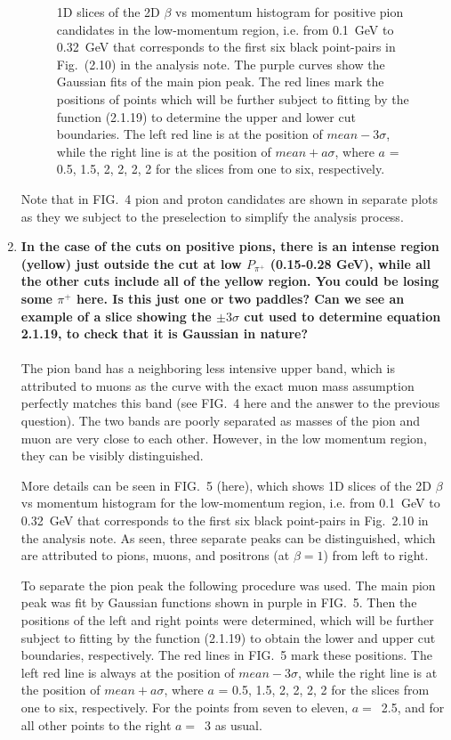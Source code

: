 \documentclass[,superscriptaddress,showpacs,amssymb,amsmath,amsfonts,linenumbers,article]{revtex4-1}
\begin{document}
\begin{enumerate}[label=\textbf{\arabic*}.]
\begin{figure}[!ht]
\caption{\small 1D slices of the 2D $\beta$ vs momentum histogram for positive pion candidates in the low-momentum region, i.e. from 0.1~GeV to 0.32~GeV that corresponds to the first six black point-pairs in Fig.~(2.10) in the analysis note. The purple curves show the Gaussian fits of the main pion peak. The red lines mark the positions of points which will be further subject to fitting by the function (2.1.19) to determine the upper and lower cut boundaries. The left red line is at the position of $mean-3\sigma$, while the right line is at the position of $mean+a\sigma$, where $a$ = 0.5, 1.5, 2, 2, 2, 2 for the slices from one to six, respectively. }  
\end{figure}

Note that in FIG.~4 pion and proton candidates are shown in separate plots as they we subject to the preselection to simplify the analysis process.

\item {\bf In the case of the cuts on positive pions, there is an intense region (yellow) just outside the cut at low $P_{\pi^{+}}$ (0.15-0.28 GeV), while all the other cuts include all of the yellow region. You could be losing some $\pi^{+}$ here. Is this just one or two paddles? Can we see an example of a slice showing the $\pm 3 \sigma$ cut used to determine equation 2.1.19, to check that it is Gaussian in nature?}\\ \\
The pion band has a neighboring less intensive upper band, which is attributed to muons as the curve with the exact muon mass assumption perfectly matches this band (see FIG.~4 here and the answer to the previous question). The two bands are poorly separated as masses of the pion and muon are very close to each other. However, in the low momentum region, they can be visibly distinguished.

More details can be seen in FIG.~5 (here), which shows 1D slices of the 2D $\beta$ vs momentum histogram for the low-momentum region, i.e. from 0.1~GeV to 0.32~GeV that corresponds to the first six black point-pairs in Fig.~2.10 in the analysis note. As seen, three separate peaks can be distinguished, which are attributed to pions, muons, and positrons (at $\beta = 1$) from left to right.

To separate the pion peak the following procedure was used. The main pion peak was fit by Gaussian functions shown in purple in FIG.~5. Then the positions of the left and right points were determined, which will be further subject to fitting by the function (2.1.19) to obtain the lower and upper cut boundaries, respectively. The red lines in FIG.~5 mark these positions. The left red line is always at the position of $mean-3\sigma$, while the right line is at the position of $mean+a\sigma$, where $a$ = 0.5, 1.5, 2, 2, 2, 2 for the slices from one to six, respectively. For the points from seven to eleven, $a = $~2.5, and for all other points to the right $a = $~3 as usual.


\end{enumerate}
\end{document}

